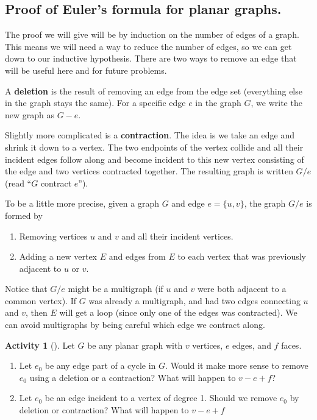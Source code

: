 \documentclass[10pt,]{book}
\newcommand{\terminology}[1]{\textbf{#1}}
\theoremstyle{plain}
\theoremstyle{definition}
\theoremstyle{definition}
\theoremstyle{definition}
\newtheorem{activity}[project]{Activity}
\numberwithin{equation}{chapter}
\begin{document}
\subsection[{Proof of Euler's formula for planar graphs.}]{Proof of Euler's formula for planar graphs.}\label{subsection-38}
\hypertarget{p-1497}{}%
The proof we will give will be by induction on the number of edges of a graph.  This means we will need a way to reduce the number of edges, so we can get down to our inductive hypothesis.  There are two ways to remove an edge that will be useful here and for future problems.%
\par
\hypertarget{p-1498}{}%
 A \terminology{deletion} is the result of removing an edge from the edge set (everything else in the graph stays the same).  For a specific edge \(e\) in the graph \(G\), we write the new graph as \(G - e\).%
\par
\hypertarget{p-1499}{}%
 Slightly more complicated is a \terminology{contraction}.  The idea is we take an edge and shrink it down to a vertex.  The two endpoints of the vertex collide and all their incident edges follow along and become incident to this new vertex consisting of the edge and two vertices contracted together.  The resulting graph is written \(G/e\) (read ``\(G\) contract \(e\)'').%
\par
\hypertarget{p-1500}{}%
To be a little more precise, given a graph \(G\) and edge \(e = \{u,v\}\), the graph \(G/e\) is formed by \leavevmode%
\begin{enumerate}
\item\hypertarget{li-66}{}\hypertarget{p-1501}{}%
Removing vertices \(u\) and \(v\) and all their incident vertices.%
\item\hypertarget{li-67}{}\hypertarget{p-1502}{}%
Adding a new vertex \(E\) and edges from \(E\) to each vertex that was previously adjacent to \(u\) or \(v\).%
\end{enumerate}
 Notice that \(G/e\) might be a multigraph (if \(u\) and \(v\) were both adjacent to a common vertex).  If \(G\) was already a multigraph, and had two edges connecting \(u\) and \(v\), then \(E\) will get a loop (since only one of the edges was contracted).  We can avoid multigraphs by being careful which edge we contract along.%
\begin{activity}[]\label{activity-284}
\hypertarget{p-1503}{}%
Let \(G\) be any planar graph with \(v\) vertices, \(e\) edges, and \(f\) faces.%
\begin{enumerate}[font=\bfseries,label=(\alph*),ref=\alph*]
\item\label{task-251} \hypertarget{p-1504}{}%
Let \(e_0\) be any edge part of a cycle in \(G\).  Would it make more sense to remove \(e_0\) using a deletion or a contraction?  What will happen to \(v - e + f\)?%
\item\label{task-252} \hypertarget{p-1505}{}%
Let \(e_0\) be an edge incident to a vertex of degree 1.  Should we remove \(e_0\) by deletion or contraction?  What will happen to \(v- e + f\)%
\end{enumerate}
\end{activity}
\end{document}
